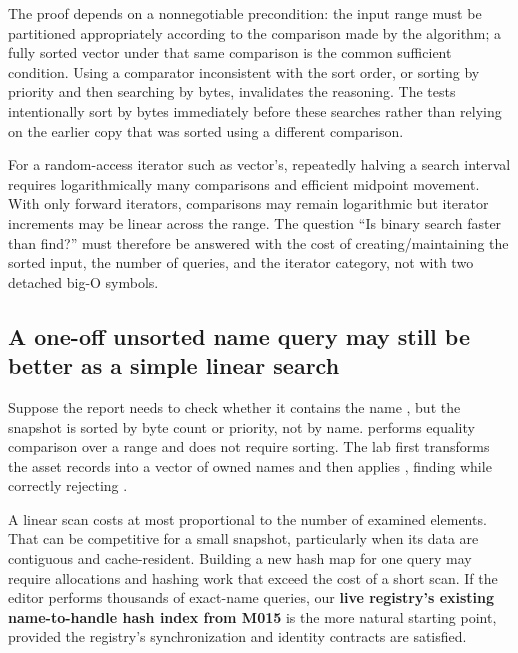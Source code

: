 The proof depends on a nonnegotiable precondition: the input range must be partitioned appropriately according to the comparison made by the algorithm; a fully sorted vector under that same comparison is the common sufficient condition. Using a comparator inconsistent with the sort order, or sorting by priority and then searching by bytes, invalidates the reasoning. The tests intentionally sort by bytes immediately before these searches rather than relying on the earlier copy that was sorted using a different comparison.

For a random-access iterator such as vector's, repeatedly halving a search interval requires logarithmically many comparisons and efficient midpoint movement. With only forward iterators, comparisons may remain logarithmic but iterator increments may be linear across the range. The question ``Is binary search faster than find?'' must therefore be answered with the cost of creating/maintaining the sorted input, the number of queries, and the iterator category, not with two detached big-O symbols.

\subsection{A one-off unsorted name query may still be better as a simple linear search}\label{05-engine-i-ch006-a-one-off-unsorted-name-query-may-still-be-better-as-a-simple-linear-search}

\hypertarget{05-engine-i-ch006-a-one-off-unsorted-name-query-may-still-be-better-as-a-simple-linear-search}{}

Suppose the report needs to check whether it contains the name , but the snapshot is sorted by byte count or priority, not by name.  performs equality comparison over a range and does not require sorting. The lab first transforms the asset records into a vector of owned names and then applies , finding  while correctly rejecting .

A linear scan costs at most proportional to the number of examined elements. That can be competitive for a small snapshot, particularly when its data are contiguous and cache-resident. Building a new hash map for one query may require allocations and hashing work that exceed the cost of a short scan. If the editor performs thousands of exact-name queries, our \textbf{live registry's existing name-to-handle hash index from M015} is the more natural starting point, provided the registry's synchronization and identity contracts are satisfied.

